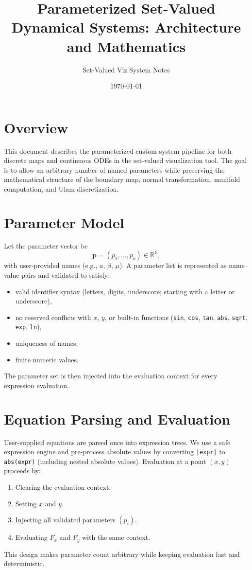 \documentclass[11pt]{article}
\title{Parameterized Set-Valued Dynamical Systems: Architecture and Mathematics}
\author{Set-Valued Viz System Notes}
\date{\today}
\begin{document}
\maketitle

\section{Overview}
This document describes the parameterized custom-system pipeline for both discrete maps and continuous ODEs in the set-valued visualization tool. The goal is to allow an arbitrary number of named parameters while preserving the mathematical structure of the boundary map, normal transformation, manifold computation, and Ulam discretization.

\section{Parameter Model}
Let the parameter vector be
\begin{equation}
\mathbf{p} = (p_1, \dots, p_k) \in \mathbb{R}^k,
\end{equation}
with user-provided names (e.g., $a$, $\beta$, $\mu$). A parameter list is represented as name--value pairs and validated to satisfy:
\begin{itemize}
\item valid identifier syntax (letters, digits, underscore; starting with a letter or underscore),
\item no reserved conflicts with $x$, $y$, or built-in functions (\texttt{sin}, \texttt{cos}, \texttt{tan}, \texttt{abs}, \texttt{sqrt}, \texttt{exp}, \texttt{ln}),
\item uniqueness of names,
\item finite numeric values.
\end{itemize}
The parameter set is then injected into the evaluation context for every expression evaluation.

\section{Equation Parsing and Evaluation}
User-supplied equations are parsed once into expression trees. We use a safe expression engine and pre-process absolute values by converting \texttt{|expr|} to \texttt{abs(expr)} (including nested absolute values). Evaluation at a point $(x, y)$ proceeds by:
\begin{enumerate}
\item Clearing the evaluation context.
\item Setting $x$ and $y$.
\item Injecting all validated parameters $(p_i)$.
\item Evaluating $F_x$ and $F_y$ with the same context.
\end{enumerate}
This design makes parameter count arbitrary while keeping evaluation fast and deterministic.
\end{document}
